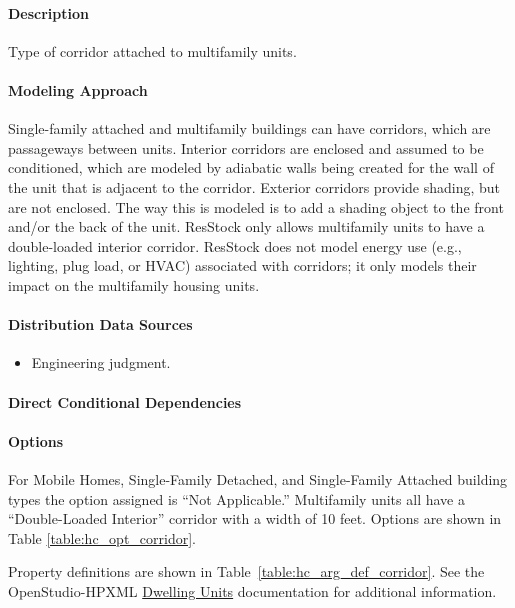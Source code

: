 \paragraph{Description}
% 
Type of corridor attached to multifamily units.

\paragraph{Modeling Approach}
Single-family attached and multifamily buildings can have corridors, which are passageways between units. Interior corridors are enclosed and assumed to be conditioned, which are modeled by adiabatic walls being created for the wall of the unit that is adjacent to the corridor. Exterior corridors provide shading, but are not enclosed. The way this is modeled is to add a shading object to the front and/or the back of the unit. ResStock only allows multifamily units to have a double-loaded interior corridor. ResStock does not model energy use (e.g., lighting, plug load, or HVAC) associated with corridors; it only models their impact on the multifamily housing units.

\paragraph{Distribution Data Sources}
% 
\begin{itemize}
    \item Engineering judgment.
\end{itemize}

\paragraph{Direct Conditional Dependencies}


\paragraph{Options}
For Mobile Homes, Single-Family Detached, and Single-Family Attached building types the option assigned is ``Not Applicable.'' Multifamily units all have a ``Double-Loaded Interior'' corridor with a width of 10 feet. Options are shown in Table \ref{table:hc_opt_corridor}.



Property definitions are shown in Table~\ref{table:hc_arg_def_corridor}. See the OpenStudio-HPXML \href{https://openstudio-hpxml.readthedocs.io/en/v1.10.0/workflow_inputs.html#dwelling-units}{Dwelling Units} documentation for additional information.

